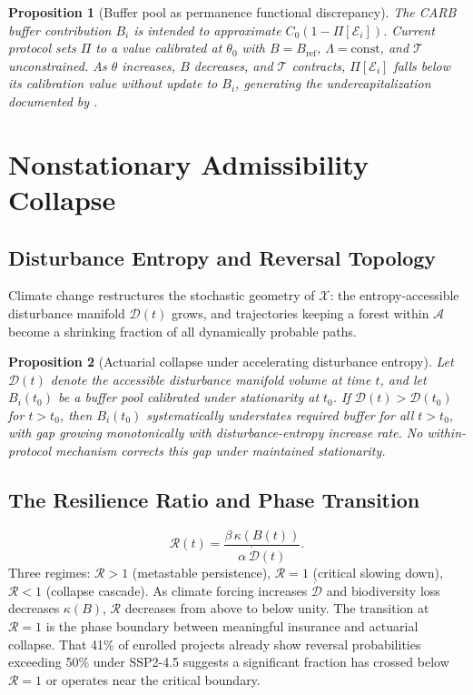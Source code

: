 \documentclass[12pt]{article}
\newtheorem{proposition}{Proposition}
\newcommand{\Ecal}{\mathcal{E}}
\newcommand{\Xcal}{\mathcal{X}}
\newcommand{\Acal}{\mathcal{A}}
\newcommand{\Tcal}{\mathcal{T}}
\begin{document}
\begin{proposition}[Buffer pool as permanence functional discrepancy]
The CARB buffer contribution $B_i$ is intended to approximate $C_0(1-\Pi[\Ecal_i])$.
Current protocol sets $\Pi$ to a value calibrated at $\theta_0$ with $B=B_\text{ref}$,
$\Lambda=\mathrm{const}$, and $\Tcal$ unconstrained. As $\theta$ increases, $B$ decreases,
and $\Tcal$ contracts, $\Pi[\Ecal_i]$ falls below its calibration value without update to
$B_i$, generating the undercapitalization documented by \citet{Wu2026}.
\end{proposition}

\section{Nonstationary Admissibility Collapse}

\subsection{Disturbance Entropy and Reversal Topology}

Climate change restructures the stochastic geometry of $\Xcal$: the entropy-accessible
disturbance manifold $\mathcal{D}(t)$ grows, and trajectories keeping a forest within
$\Acal$ become a shrinking fraction of all dynamically probable paths.

\begin{proposition}[Actuarial collapse under accelerating disturbance entropy]
Let $\mathcal{D}(t)$ denote the accessible disturbance manifold volume at time $t$,
and let $B_i(t_0)$ be a buffer pool calibrated under stationarity at $t_0$. If
$\mathcal{D}(t)>\mathcal{D}(t_0)$ for $t>t_0$, then $B_i(t_0)$ systematically understates
required buffer for all $t>t_0$, with gap growing monotonically with disturbance-entropy
increase rate. No within-protocol mechanism corrects this gap under maintained stationarity.
\end{proposition}

\subsection{The Resilience Ratio and Phase Transition}

\begin{equation}
\label{eq:resilience-ratio}
\mathcal{R}(t)
= \frac{\beta\,\kappa(B(t))}{\alpha\,\dot{\mathcal{D}}(t)}.
\end{equation}
Three regimes: $\mathcal{R}>1$ (metastable persistence), $\mathcal{R}=1$ (critical slowing
down), $\mathcal{R}<1$ (collapse cascade). As climate forcing increases $\dot{\mathcal{D}}$
and biodiversity loss decreases $\kappa(B)$, $\mathcal{R}$ decreases from above to below
unity. The transition at $\mathcal{R}=1$ is the phase boundary between meaningful insurance
and actuarial collapse. That 41\% of enrolled projects already show reversal probabilities
exceeding 50\% under SSP2-4.5 suggests a significant fraction has crossed below
$\mathcal{R}=1$ or operates near the critical boundary.
\end{document}
